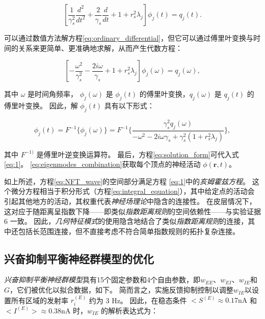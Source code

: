 \documentclass[lang=cn,a4paper,newtx,citestyle=gb7714-2015, bibstyle=gb7714-2015]{elegantpaper}
\begin{document}
\begin{equation}\label{eq:ordinary_differential}
	[
		\frac{1}{\gamma _s^2}
		\frac{d^2}{dt^2}
		+
		\frac{2}{\gamma _s}
		\frac{d}{dt}
		+ 1 + r_s^2 \lambda_j
	]
	\phi_j(t) 
	=
	q_j(t).
\end{equation}


可以通过数值方法解方程\ref{eq:ordinary_differential}，但它可以通过傅里叶变换与时间的关系来更简单、更准确地求解，从而产生代数方程：

\begin{equation}\label{eq:algebraic_equation}
	[
		- \frac{\omega ^2}{\gamma_s^2}
		- \frac{2 i \omega}{\gamma_s}
		+ 1
		+ r_s^2 \lambda_j
	]
	\phi_j(\omega)
	=
	q_j(\omega),
\end{equation}

其中 $ ω $ 是时间角频率， $ \phi_j (\omega) $ 是 $ \phi_j (t) $ 的傅里叶变换，$ q_j (\omega) $ 是 $ q_j (t) $ 的傅里叶变换。 因此，解 $ \phi_j (t) $ 具有以下形式：

\begin{equation}\label{eq:solution_form}
	\phi_j(t)
	=
	F^{-1} \{\phi_j(\omega)\}
	=
	F^{-1}
	\{
		\frac{
				\gamma_s^2 q_j(\omega)
			 }
		 	 {
		 	 	- \omega^2
		 	 	- 2 i \omega \gamma_s
		 	 	+ \gamma_s^2
		 	 		(1 + r_s^2 \lambda_j)
		 	 }
	\},
\end{equation}

其中 $ F^{-1)} $ 是傅里叶逆变换运算符。
最后，方程\ref{eq:solution_form}可代入式\ref{eq:1}。
\ref{eq:eigenmodes_combination}获取每个顶点的神经活动 $ \phi(\boldsymbol{r},t) $。



如上所述，方程\ref{eq:NFT_wave}的空间部分满足方程 \ref{eq:1}中的\textit{亥姆霍兹方程}。
这个微分方程相当于积分形式（方程\ref{eq:integral_equation}），其中给定点的活动会引起其他地方的活动，其权重代表\textit{神经场理论}中隐含的连接性。
在皮层情况下，这对应于随距离呈指数下降——即类似\textit{指数距离规则}的空间依赖性——与实验证据 6 一致。
因此，\textit{几何特征模式}的使用隐含地结合了类似\textit{指数距离规则}的连接，其中还包括长范围连接，但不直接考虑不符合简单指数规则的拓扑复杂连接。



\subsection{兴奋抑制平衡神经群模型的优化} \label{sec:mass_optimization}

\textit{兴奋抑制平衡}\textit{神经群模型}具有15个固定参数和4个自由参数，即$ w_{EE} $、$ w_{EI} $、$ w_{IE} $和 $ G $，它们被优化以拟合数据，如下\cite{rosen2022estimation}。
简而言之，实施反馈抑制控制\cite{van2012high}以调整$ w_{IE} $以设置所有区域的发射率 $ r_i^{(E)} $ 约为 3 Hz。
因此，在稳态条件 $ <S^{(E)} \approx 0.17 \text{nA} $ 和 $ <I^{(E)}> \approx 0.38 \text{nA} $ 时，$ w_{IE} $ 的解析表达式为：
\end{document}
